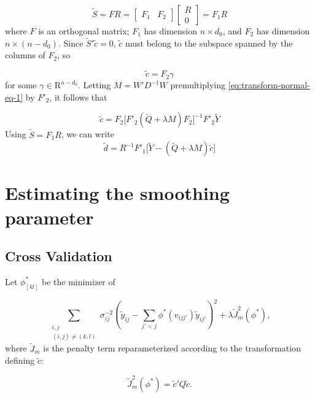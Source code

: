 \documentclass[12pt]{article}
\newcommand{\tildec}{\tilde{c}}
\newcommand{\tildeS}{\tilde{S}}
\newcommand{\tilded}{\tilde{d}}
\newcommand{\tildeY}{\tilde{Y}}
\newcommand{\tildey}{\tilde{y}}
\newcommand{\tildeQ}{\tilde{Q}}
\theoremstyle{definition}
\begin{document}
\begin{equation*}
\tildeS =  F R = \begin{bmatrix} F_1 &  F_2 \end{bmatrix} \begin{bmatrix} R \\  0 \end{bmatrix} = F_1 R
\end{equation*}
\noindent
where $F$ is an orthogonal matrix; $F_1$ has dimension $n \times d_0$,  and $F_2$ has dimension $n \times \left(n-d_0\right)$. Since $\tildeS'\tildec = 0$, $\tildec$ must belong to the subspace spanned by the columns of $F_2$, so 

\[
\tildec = F_2 \gamma
\] 
\noindent
for some $\gamma \in \mathrm{R}^{n-d_0}$. Letting $M = W'D^{-1}W$ premultiplying \ref{eq:transform-normal-eq-1} by $F'_2$, it follows that 

\begin{equation} \label{eq:solve-for-ctilde}
\tildec =  F_2\bigg[ F'_2 \left( \tildeQ + \lambda M \right)F_2 \bigg]^{-1} F'_2 \tildeY
\end{equation}
\bigskip
\noindent
Using $\tildeS = F_1 R$, we can write
\begin{equation} \label{eq:solve-for-dtilde}
\tilded = R^{-1} F'_1 \bigg[ \tildeY - \left( \tildeQ + \lambda M \right) \tildec  \bigg]
\end{equation}

\section{Estimating the smoothing parameter}

\subsection{Cross Validation}

Let $\phi_{\left[kl\right]}^{*}$ be the minimizer of 

\begin{equation}
\sum_{\substack{i,j \\ \left(i,j\right)\neq \left(k,l\right)}}  \sigma^{-2}_{ij}\left( \tildey_{ij} -  \sum_{j'<j}\phi^*\left( v_{ijj'} \right) \tildey_{ij'} \right)^2 + \lambda \tilde{J}_m^2 \left( \phi^* \right),
\end{equation}
\bigskip
where $\tilde{J}_m$ is the penalty term reparameterized according to the transformation defining $\tildec$:

\begin{equation}
\tilde{J}_m^2 \left( \phi^* \right) = \tildec' Q \tildec.
\end{equation}
\end{document}
